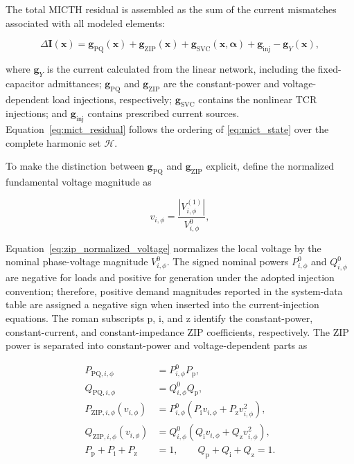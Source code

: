 \documentclass[journal]{IEEEtran}
\begin{document}
The total MICTH residual is assembled as the sum of the current mismatches
associated with all modeled elements:

\begin{equation}
    \Delta\mathbf{I}(\mathbf{x}) =
    \mathbf{g}_{\mathrm{PQ}}(\mathbf{x})
    + \mathbf{g}_{\mathrm{ZIP}}(\mathbf{x})
    + \mathbf{g}_{\mathrm{SVC}}(\mathbf{x},\boldsymbol{\alpha})
    + \mathbf{g}_{\mathrm{inj}}
    - \mathbf{g}_{Y}(\mathbf{x}),
    \label{eq:mict_residual}
\end{equation}

\noindent where $\mathbf{g}_{Y}$ is the current calculated from the linear
network, including the fixed-capacitor admittances; $\mathbf{g}_{\mathrm{PQ}}$
and $\mathbf{g}_{\mathrm{ZIP}}$ are the constant-power and voltage-dependent
load injections, respectively; $\mathbf{g}_{\mathrm{SVC}}$ contains the
nonlinear TCR injections; and $\mathbf{g}_{\mathrm{inj}}$ contains prescribed
current sources. Equation~\eqref{eq:mict_residual} follows the ordering of
\eqref{eq:mict_state} over the complete harmonic set $\mathcal{H}$.

To make the distinction between $\mathbf{g}_{\mathrm{PQ}}$ and
$\mathbf{g}_{\mathrm{ZIP}}$ explicit, define the normalized fundamental
voltage magnitude as

\begin{equation}
    v_{i,\phi}=\frac{\left|V_{i,\phi}^{(1)}\right|}{V_{i,\phi}^{0}},
    \label{eq:zip_normalized_voltage}
\end{equation}

Equation~\eqref{eq:zip_normalized_voltage} normalizes the local voltage by the
nominal phase-voltage magnitude $V_{i,\phi}^{0}$. The signed nominal powers
$P_{i,\phi}^{0}$ and $Q_{i,\phi}^{0}$ are negative for loads and positive for
generation under the adopted injection convention; therefore, positive demand
magnitudes reported in the system-data table are assigned a negative sign when
inserted into the current-injection equations. The roman subscripts
$\mathrm{p}$, $\mathrm{i}$, and $\mathrm{z}$ identify the constant-power,
constant-current, and constant-impedance ZIP coefficients, respectively. The
ZIP power is separated into constant-power and voltage-dependent parts as

\begin{equation}
\begin{aligned}
P_{\mathrm{PQ},i,\phi}
&=P_{i,\phi}^{0}P_{\mathrm{p}},\\
Q_{\mathrm{PQ},i,\phi}
&=Q_{i,\phi}^{0}Q_{\mathrm{p}},\\
P_{\mathrm{ZIP},i,\phi}(v_{i,\phi})
&=P_{i,\phi}^{0}\left(P_{\mathrm{i}}v_{i,\phi}
+P_{\mathrm{z}}v_{i,\phi}^{2}\right),\\
Q_{\mathrm{ZIP},i,\phi}(v_{i,\phi})
&=Q_{i,\phi}^{0}\left(Q_{\mathrm{i}}v_{i,\phi}
+Q_{\mathrm{z}}v_{i,\phi}^{2}\right),\\
P_{\mathrm{p}}+P_{\mathrm{i}}+P_{\mathrm{z}}&=1,\qquad
Q_{\mathrm{p}}+Q_{\mathrm{i}}+Q_{\mathrm{z}}=1.
\end{aligned}
\label{eq:zip_power_decomposition}
\end{equation}
\end{document}
